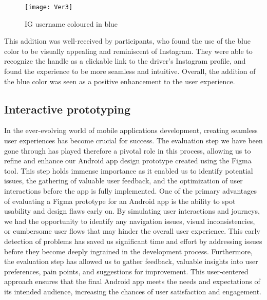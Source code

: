 \documentclass{article}
\begin{document}
\begin{figure}[htbp]
    \centering
    \texttt{[image: Ver3]}
    \caption{IG username coloured in blue}
\end{figure}

This addition was well-received by participants, who found the use of the blue color to be visually appealing and reminiscent of Instagram. They were able to recognize the handle as a clickable link to the driver's Instagram profile, and found the experience to be more seamless and intuitive. Overall, the addition of the blue color was seen as a positive enhancement to the user experience.

\newpage

\subsection{Interactive prototyping}
In the ever-evolving world of mobile applications development, creating seamless user experiences has become crucial for success. The evaluation step we have been gone through has played therefore a pivotal role in this process, allowing us to refine and enhance our Android app design prototype created using the Figma tool. This step holds immense importance as it enabled us to identify potential issues, the gathering of valuable user feedback, and the optimization of user interactions before the app is fully implemented. One of the primary advantages of evaluating a Figma prototype for an Android app is the ability to spot usability and design flaws early on. By simulating user interactions and journeys, we had the opportunity to identify any navigation issues, visual inconsistencies, or cumbersome user flows that may hinder the overall user experience. This early detection of problems has saved us significant time and effort by addressing issues before they become deeply ingrained in the development process. Furthermore, the evaluation step has allowed us to gather feedback, valuable insights into user preferences, pain points, and suggestions for improvement. This user-centered approach ensures that the final Android app meets the needs and expectations of its intended audience, increasing the chances of user satisfaction and engagement. 
\end{document}
